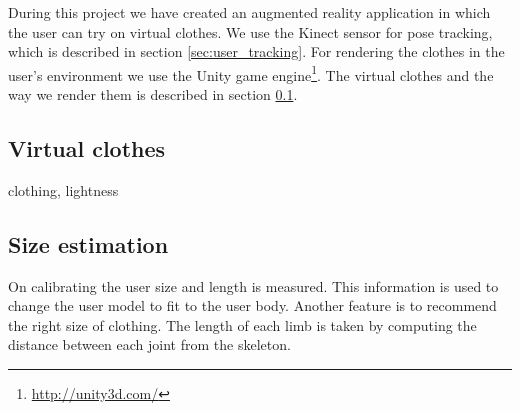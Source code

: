 \documentclass[a4paper]{article}
\begin{document}
During this project we have created an augmented reality application in which the user can try on virtual clothes. We use the Kinect sensor for pose tracking, which is described in section \ref{sec:user_tracking}. For rendering the clothes in the user's environment we use the Unity game engine\footnote{\url{http://unity3d.com/}}. The virtual clothes and the way we render them is described in section \ref{sec:virtual_clothes}.






\subsection{Virtual clothes}
\label{sec:virtual_clothes}

clothing, lightness

\subsection{Size estimation}
\label{sec:size_estimation}


On calibrating the user size and length is measured. This information is used to change the user model to fit to the user body. Another feature is to recommend the right size of clothing. The length of each limb is taken by computing the distance between each joint from the skeleton.
\end{document}
